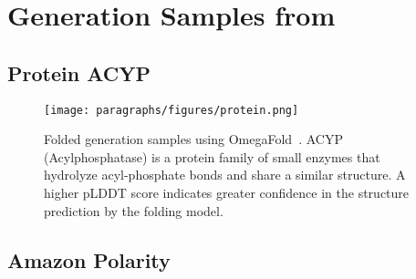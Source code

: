 \section{Generation Samples from \method{}}

\subsection{Protein ACYP}
\begin{figure}[H]
    \centering
    \texttt{[image: paragraphs/figures/protein.png]}
    \caption{Folded generation samples using OmegaFold~\citep{OmegaFold}. ACYP (Acylphosphatase) is a protein family of small enzymes that hydrolyze acyl-phosphate bonds and share a similar structure. A higher pLDDT score indicates greater confidence in the structure prediction by the folding model.}
    \label{fig:protein_sample_result}
\end{figure}

\newpage

\subsection{Amazon Polarity}

